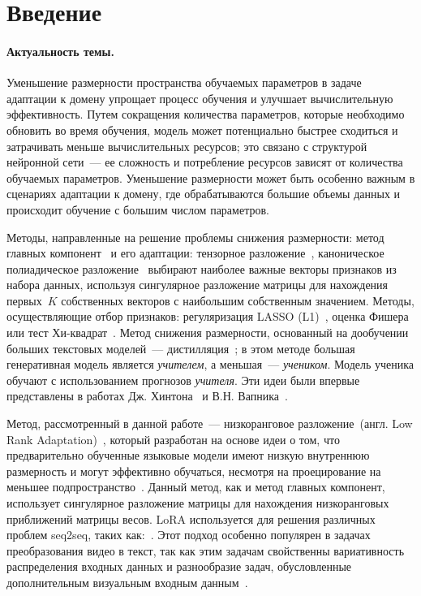 \newpage


\section{Введение}
\paragraph{Актуальность темы.} 
    Уменьшение размерности пространства обучаемых параметров в задаче адаптации к домену упрощает процесс обучения и улучшает вычислительную эффективность. Путем сокращения количества параметров, которые необходимо обновить во время обучения, модель может потенциально быстрее сходиться и затрачивать меньше вычислительных ресурсов; это связано с структурой нейронной сети~--- ее сложность и потребление ресурсов зависят от количества обучаемых параметров. Уменьшение размерности может быть особенно важным в сценариях адаптации к домену, где обрабатываются большие объемы данных и происходит обучение с большим числом параметров.
    
    Методы, направленные на решение проблемы снижения размерности: метод главных компонент~\cite{wold1987principal} и его адаптации: тензорное разложение~\cite{oseledets2011tensor,qazi2024gpt}, каноническое полиадическое разложение~\cite{zare2018extension} выбирают наиболее важные векторы признаков из набора данных, используя сингулярное разложение матрицы для нахождения первых~$K$ собственных векторов с наибольшим собственным значением. Методы, осуществляющие отбор признаков: регуляризация LASSO (L1)~\cite{fonti2017feature}, оценка Фишера~\cite{gu2012generalized} или тест Хи-квадрат~\cite{zhai2018chi}. Метод снижения размерности, основанный на дообучении больших текстовых моделей~--- дистилляция~\cite{hsieh2023distilling}; в этом методе большая генеративная модель является \textit{учителем}, а меньшая~--- \textit{учеником}. Модель ученика обучают с использованием прогнозов \textit{учителя}. Эти идеи были впервые представлены в работах Дж. Хинтона~\cite{hinton2015nips} и В.Н. Вапника~\cite{vapnik2015learning}.

    Метод, рассмотренный в данной работе~--- низкоранговое разложение~(англ. Low Rank Adaptation)~\cite{hu2021lora}, который разработан на основе идеи о том, что предварительно обученные языковые модели имеют низкую внутреннюю размерность и могут эффективно обучаться, несмотря на проецирование на меньшее подпространство~\cite{aghajanyan2020intrinsic}. Данный метод, как и метод главных компонент, использует сингулярное разложение матрицы для нахождения низкоранговых приближений матрицы весов. LoRA используется для решения различных проблем seq2seq, таких как:~\cite{zhang2023adding,dettmers2024qlora,dai2024instructblip}. Этот подход особенно популярен в задачах преобразования видео в текст, так как этим задачам свойственны вариативность распределения входных данных и разнообразие задач, обусловленные дополнительным визуальным входным данным~\cite{dai2024instructblip}.

